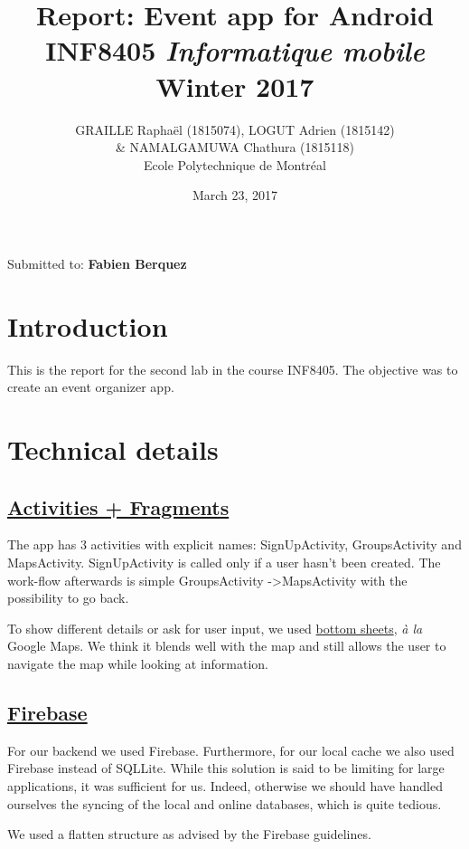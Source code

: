 \documentclass{article}
\title{Report: Event app for Android\\ INF8405 \textit{Informatique mobile}\\ Winter 2017 }
\author{GRAILLE Raphaël  (1815074), LOGUT Adrien (1815142) \\ \& NAMALGAMUWA Chathura (1815118)\\ Ecole Polytechnique de Montréal}
\date{March 23, 2017}
\begin{document}
\maketitle

Submitted to: \textbf{Fabien Berquez}
\newpage

\tableofcontents

\newpage

\section{Introduction}

This is the report for the second lab in the course INF8405. The objective was to create an event organizer app.

\section{Technical details}


\subsection{\href{http://data.whicdn.com/images/28718572/large.gif}{Activities + Fragments}}

The app has 3 activities with explicit names: SignUpActivity, GroupsActivity and MapsActivity. SignUpActivity is called only if a user hasn't been created. The work-flow afterwards is simple GroupsActivity -\textgreater MapsActivity with the possibility to go back. 

To show different details or ask for user input, we used \href{https://material.io/guidelines/components/bottom-sheets.html}{bottom sheets}, \textit{à la} Google Maps. We think it blends well with the map and still allows the user to navigate the map while looking at information. 

\subsection{\href{http://bestanimations.com/Nature/Fire/simpsons-fire-gif.gif}{Firebase}}

For our backend we used Firebase. Furthermore, for our local cache we also used Firebase instead of SQLLite. While this solution is said to be limiting for large applications, it was sufficient for us. Indeed, otherwise we should have handled ourselves the syncing of the local and online databases, which is quite tedious. 

We used a flatten structure as advised by the Firebase guidelines. 
\end{document}
